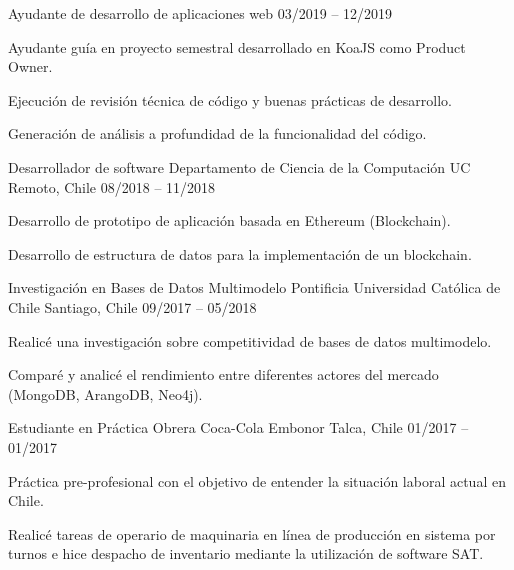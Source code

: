 \begin{cventries}
  \cventry
    {Ayudante de desarrollo de aplicaciones web} %
    {} %
    {} %
    {03/2019 – 12/2019} %
    {
      \begin{cvitems} %
        \item {Ayudante guía en proyecto semestral desarrollado en KoaJS como Product Owner.}
        \item {Ejecución de revisión técnica de código y buenas prácticas de desarrollo.}
        \item {Generación de análisis a profundidad de la funcionalidad del código.}
      \end{cvitems}
    }

  \cventry
    {Desarrollador de software} %
    {Departamento de Ciencia de la Computación UC} %
    {Remoto, Chile} %
    {08/2018 – 11/2018} %
    {
      \begin{cvitems} %
        \item {Desarrollo de prototipo de aplicación basada en Ethereum (Blockchain).}
        \item {Desarrollo de estructura de datos para la implementación de un blockchain.}
      \end{cvitems}
    }

  \cventry
    {Investigación en Bases de Datos Multimodelo} %
    {Pontificia Universidad Católica de Chile} %
    {Santiago, Chile} %
    {09/2017 – 05/2018} %
    {
      \begin{cvitems} %
        \item {Realicé una investigación sobre competitividad de bases de datos multimodelo.}
        \item {Comparé y analicé el rendimiento entre diferentes actores del mercado (MongoDB, ArangoDB, Neo4j).}
      \end{cvitems} 
    }

  \cventry
    {Estudiante en Práctica Obrera} %
    {Coca-Cola Embonor } %
    {Talca, Chile} %
    {01/2017 – 01/2017 } %
    {
      \begin{cvitems} %
        \item {Práctica pre-profesional con el objetivo de entender la situación laboral actual en Chile.}
        \item {Realicé tareas de operario de maquinaria en línea de producción en sistema por turnos e hice despacho de inventario mediante la utilización de software SAT.}
      \end{cvitems}
    }

\end{cventries}
